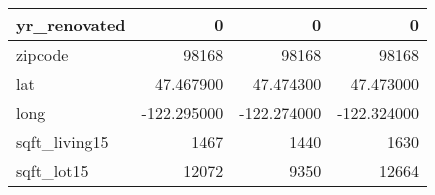 \begin{table}[H]
\begin{tabular}{|l|r|r|r|}
\hline yr\_renovated & \cellcolor[rgb]{0.9, 0.54, 0.52} 0 & \cellcolor[rgb]{0.9, 0.54, 0.52} 0 & \cellcolor[rgb]{0.9, 0.54, 0.52} 0 \\
\hline zipcode & \cellcolor[rgb]{0.9, 0.54, 0.52} 98168 & \cellcolor[rgb]{0.9, 0.54, 0.52} 98168 & \cellcolor[rgb]{0.9, 0.54, 0.52} 98168 \\
\hline lat & \cellcolor[rgb]{0.9, 0.54, 0.52} 47.467900 & 47.474300 & 47.473000 \\
\hline long & \cellcolor[rgb]{0.9, 0.54, 0.52} -122.295000 & \cellcolor[rgb]{0.9, 0.54, 0.52} -122.274000 & \cellcolor[rgb]{0.9, 0.54, 0.52} -122.324000 \\
\hline sqft\_living15 & \cellcolor[rgb]{0.9, 0.54, 0.52} 1467 & 1440 & 1630 \\
\hline sqft\_lot15 & \cellcolor[rgb]{0.9, 0.54, 0.52} 12072 & 9350 & 12664 \\
\hline
\end{tabular}
\end{table}
